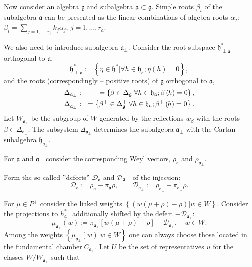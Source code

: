 \documentclass[preprint,12pt]{elsarticle}
\newcommand{\gf}{\mathfrak{g}}
\newcommand{\af}{\mathfrak{a}}
\newcommand{\afb}{\mathfrak{a}_{\bot}}
\newcommand{\hf}{\mathfrak{h}}
\begin{document}
Now consider an algebra $\gf$ and subalgebra $\af\subset \gf$. Simple roots $\beta_{i}$ of the subalgebra $\af$ can be presented as the linear combinations of algebra roots $\alpha_{j}$: $\beta_{i}=\sum_{j=1,\dots,r_{\gf}}k_{j} \alpha_{j},\ j=1,\dots,r_{\af}$. 

We also need to introduce subalgebra $\afb$. 
Consider the root subspace $\hf_{\perp \af}^{\ast }$ orthogonal to
$\af$,
\begin{equation*}
\hf_{\perp \af}^{\ast }:=\left\{ \eta \in \hf^{\ast }|\forall
h\in \hf_{\af};\eta \left( h\right) =0\right\} ,
\end{equation*}
and the roots (correspondingly -- positive roots) of $\gf$ orthogonal
to $\af$,
\begin{eqnarray}
\Delta _{\afb} &:&=\left\{ \beta \in \Delta _{\gf}|\forall
h\in \hf_{\af};\beta \left( h\right) =0\right\} ,
\label{delta a ort} \\
\Delta _{\afb}^{+} &:&=\left\{ \beta ^{+}\in \Delta _{\gf%
}^{+}|\forall h\in \hf_{\af};\beta ^{+}\left( h\right) =0\right\} .
\notag
\end{eqnarray}
Let $W_{\afb}$ be the subgroup of $W$ generated by the
reflections $w_{\beta }$ with the roots $\beta \in \Delta _{\af_{\perp
}}^{+}$. The subsystem $\Delta _{\afb}$ determines the
subalgebra $\afb$ with the Cartan subalgebra $\hf_{\af%
_{\perp }}$. 

For $\af$ and $\afb$ consider the
corresponding Weyl vectors, $\rho _{\af}$ and $\rho _{\af_{\perp
}} $.

 Form the so called ''defects'' $\mathcal{D}_{\af}$ and $\mathcal{%
D}_{\afb}$ of the injection:
\begin{equation}
\mathcal{D}_{\af}:=\rho _{\af}-\pi _{\af}\rho , \qquad
\mathcal{D}_{\afb}:=\rho _{\afb}-\pi _{\af%
_{\perp }}\rho .  \label{defect-ort}
\end{equation}

For $\mu \in P^{+}$ consider the linked weights $\left\{
\left( w(\mu +\rho )-\rho \right) |w\in W\right\} $. Consider the projections to
$h_{\afb}^{\ast }$ additionally shifted by the defect $-%
\mathcal{D}_{\afb}$:
\begin{equation*}
\mu _{\afb}\left( w\right) :=\pi _{\afb}\left[
w(\mu +\rho )-\rho \right] -\mathcal{D}_{\afb},\quad w\in W.
\end{equation*}
Among the weights $\left\{ \mu _{\af_{\perp
}}\left( w\right) |w\in W\right\} $ one can always choose those located in
the fundamental chamber $\overline{C_{\afb}}$. Let $U$ be the
set of representatives $u$ for the classes $W/W_{\afb}$ such
that
\end{document}
